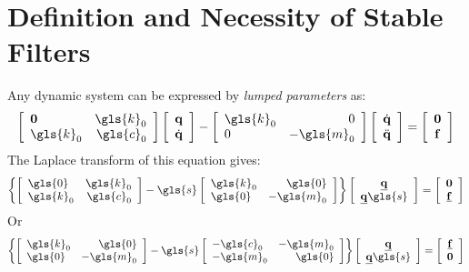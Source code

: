 \section{Definition and Necessity of Stable Filters}
Any dynamic system can be expressed by \emph{lumped parameters} as:
\begin{align}
\left[
\begin{array}{lr}
\mathbf{0} & \gls{k}_0\\
\gls{k}_0 & \gls{c}_0
\end{array}
\right]
\left[\begin{array}{c} \mathbf{q} \\ \dot{\mathbf{q}}\end{array}\right] - \left[\begin{array}{lr}\gls{k}_0 & 0\\0 & -\gls{m}_0\end{array}\right]
\left[\begin{array}{c}\dot{\mathbf{q}}\\\ddot{\mathbf{q}}\end{array}\right] = \left[\begin{array}{c} \mathbf{0} \\ \mathbf{f}\end{array}\right]
\end{align}
The Laplace transform of this equation gives: %
\begin{align}
\left\{ 
\mat{\gls{0}}{\gls{k}_0}{\gls{k}_0}{\gls{c}_0} - \gls{s} \mat{\gls{k}_0}{\gls{0}}{\gls{0}}{-\gls{m}_0}
\right\}
\left[ \begin{array}{c} \underline{\mathbf{q}} \\ \underline{\mathbf{q}}\gls{s} \end{array} \right] = \left[ \begin{array}{c} \mathbf{0} \\ \underline{\mathbf{f}} \end{array} \right]
\end{align}
Or
\begin{align}
\left\{ 
\mat{\gls{k}_0}{\gls{0}}{\gls{0}}{-\gls{m}_0} - \gls{s} \mat{-\gls{c}_0}{-\gls{m}_0}{-\gls{m}_0}{\gls{0}}
\right\}
\left[ \begin{array}{c} \underline{\mathbf{q}} \\ \underline{\mathbf{q}}\gls{s} \end{array} \right] = \left[ \begin{array}{c} \underline{\mathbf{f}} \\ \mathbf{0} \end{array} \right]
\end{align}
